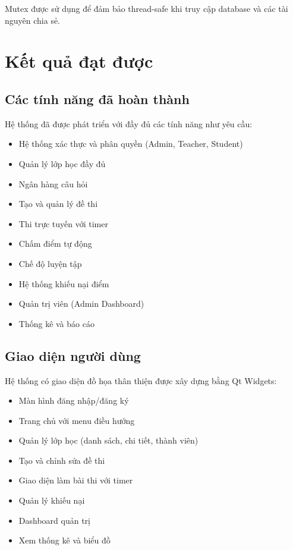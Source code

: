 \documentclass[12pt,a4paper]{report}
\begin{document}
Mutex được sử dụng để đảm bảo thread-safe khi truy cập database và các tài nguyên chia sẻ.

\chapter{Kết quả đạt được}

\section{Các tính năng đã hoàn thành}

Hệ thống đã được phát triển với đầy đủ các tính năng như yêu cầu:

\begin{itemize}
    \item [$\checkmark$] Hệ thống xác thực và phân quyền (Admin, Teacher, Student)
    \item [$\checkmark$] Quản lý lớp học đầy đủ
    \item [$\checkmark$] Ngân hàng câu hỏi
    \item [$\checkmark$] Tạo và quản lý đề thi
    \item [$\checkmark$] Thi trực tuyến với timer
    \item [$\checkmark$] Chấm điểm tự động
    \item [$\checkmark$] Chế độ luyện tập
    \item [$\checkmark$] Hệ thống khiếu nại điểm
    \item [$\checkmark$] Quản trị viên (Admin Dashboard)
    \item [$\checkmark$] Thống kê và báo cáo
\end{itemize}

\section{Giao diện người dùng}

Hệ thống có giao diện đồ họa thân thiện được xây dựng bằng Qt Widgets:

\begin{itemize}
    \item Màn hình đăng nhập/đăng ký
    \item Trang chủ với menu điều hướng
    \item Quản lý lớp học (danh sách, chi tiết, thành viên)
    \item Tạo và chỉnh sửa đề thi
    \item Giao diện làm bài thi với timer
    \item Quản lý khiếu nại
    \item Dashboard quản trị
    \item Xem thống kê và biểu đồ
\end{itemize}
\end{document}
